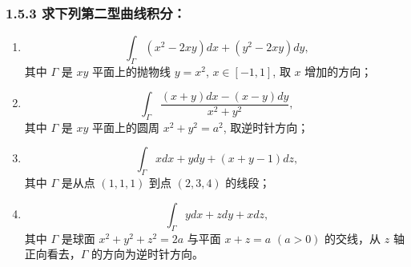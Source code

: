 \documentclass[12pt]{ctexart}
\begin{document}
\subsubsection*{1.5.3 求下列第二型曲线积分：}
\begin{enumerate}
    \item \[
        \int_{\Gamma} \left( x^2 - 2xy \right) dx + \left( y^2 - 2xy \right) dy,
        \]
        其中 $\Gamma$ 是 $xy$ 平面上的抛物线 $y = x^2$, $x \in [-1, 1]$, 取 $x$ 增加的方向；

    \item \[
        \int_{\Gamma} \frac{(x + y) dx - (x - y) dy}{x^2 + y^2},
        \]
        其中 $\Gamma$ 是 $xy$ 平面上的圆周 $x^2 + y^2 = a^2$, 取逆时针方向；

    \item \[
        \int_{\Gamma} xdx + ydy + (x + y - 1)dz,
        \]
        其中 $\Gamma$ 是从点 $(1,1,1)$ 到点 $(2,3,4)$ 的线段；

    \item \[
        \int_{\Gamma} ydx + zdy + xdz,
        \]
        其中 $\Gamma$ 是球面 $x^2 + y^2 + z^2 = 2a$ 与平面 $x + z = a$ $(a > 0)$ 的交线，从 $z$ 轴正向看去，$\Gamma$ 的方向为逆时针方向。
\end{enumerate}
\end{document}
